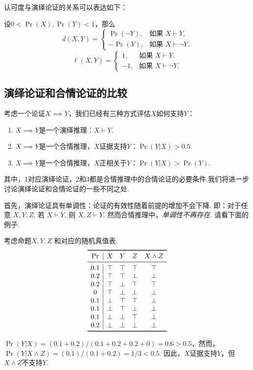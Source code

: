 认可度与演绎论证的关系可以表达如下：
\begin{proposition}
    设$0< \Pr(X),\Pr(Y) < 1$，那么
    \[
        d(X, Y) =
        \begin{cases}
            \Pr(\neg Y),& \text{如果 } X \vdash Y, \\
            -\Pr(Y),& \text{如果 } X \vdash \neg Y.
        \end{cases}
    \]
    \[\ell(X, Y) = 
        \begin{cases}
            1,& \text{如果 } X \vdash Y, \\
            -1,& \text{如果 } X \vdash \neg Y.
        \end{cases}
    \]
\end{proposition}


\subsection{演绎论证和合情论证的比较}

考虑一个论证$X\implies Y$，我们已经有三种方式评估$X$如何支持$Y$：
    \begin{enumerate}
        \item $X\implies Y$是一个演绎推理：$X\vdash Y$.
        \item $X\implies Y$是一个合情推理，$X$证据支持$Y$：$\Pr(Y|X) > 0.5$.
        \item $X\implies Y$是一个合情推理，$X$正相关于$Y$：$\Pr(Y|X) > \Pr(Y)$.
    \end{enumerate}
其中，1对应演绎论证，2和3都是合情推理中的合情论证的必要条件.我们将进一步讨论演绎论证和合情论证的一些不同之处.

首先，演绎论证具有单调性：论证的有效性随着前提的增加不会下降. 即：对于任意 $X, Y, Z$, 若 $X\vdash Y$, 则 $X,Z\vdash Y$. 然而合情推理中，\textit{单调性不再存在}. 请看下面的例子.

\begin{example}[非单调性：例子]
考虑命题$X, Y, Z$ 和对应的随机真值表.
\[\begin{array}{c|ccccc}
        \toprule
        \Pr & X & Y & Z & X \wedge Z \\ \midrule
        0.1 & \T & \T & \T & \T\\
        0.2 & \T & \T & \F & \F\\
        0.2 & \T & \F & \T & \T\\
        0 & \T & \F & \F & \F\\ 
        0.1 & \F & \T & \T & \F\\ 
        0.1 & \F & \T & \F & \F\\
        0.1 & \F & \F & \T & \F\\
        0.2 & \F & \F & \F & \F\\
        \bottomrule
\end{array}\]

$\Pr(Y|X) = (0.1 + 0.2) / (0.1 + 0.2 + 0.2 + 0) = 0.6 > 0.5$，然而，$\Pr(Y|X \wedge Z) = (0.1) / (0.1 + 0.2) = 1/3 < 0.5$. 因此，$X$证据支持$Y$，但$X\wedge Z$不支持$Y$.
\end{example}

